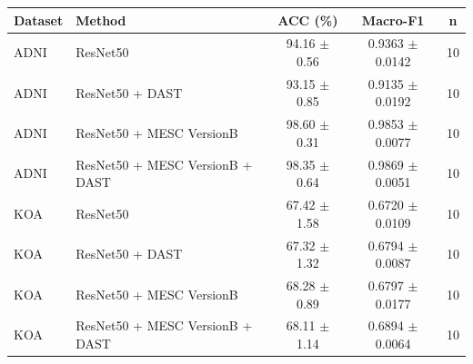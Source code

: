 \begin{tabular}{llccc}
\toprule
Dataset & Method & ACC (\%) & Macro-F1 & n \\
\midrule
ADNI & ResNet50 & 94.16 $\pm$ 0.56 & 0.9363 $\pm$ 0.0142 & 10 \\
ADNI & ResNet50 + DAST & 93.15 $\pm$ 0.85 & 0.9135 $\pm$ 0.0192 & 10 \\
ADNI & ResNet50 + MESC VersionB & 98.60 $\pm$ 0.31 & 0.9853 $\pm$ 0.0077 & 10 \\
ADNI & ResNet50 + MESC VersionB + DAST & 98.35 $\pm$ 0.64 & 0.9869 $\pm$ 0.0051 & 10 \\
KOA & ResNet50 & 67.42 $\pm$ 1.58 & 0.6720 $\pm$ 0.0109 & 10 \\
KOA & ResNet50 + DAST & 67.32 $\pm$ 1.32 & 0.6794 $\pm$ 0.0087 & 10 \\
KOA & ResNet50 + MESC VersionB & 68.28 $\pm$ 0.89 & 0.6797 $\pm$ 0.0177 & 10 \\
KOA & ResNet50 + MESC VersionB + DAST & 68.11 $\pm$ 1.14 & 0.6894 $\pm$ 0.0064 & 10 \\
\bottomrule
\end{tabular}
